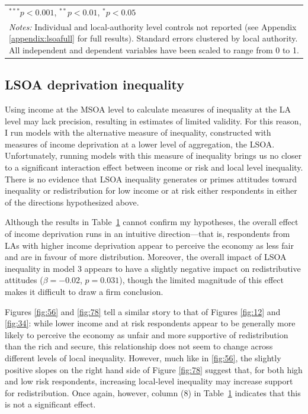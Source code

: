 \documentclass[12pt, letter]{scrartcl}
\begin{document}
\begin{table}[t]
{\begin{tabular}{l c c c c c c c c}
\toprule[1.5pt]
\multicolumn{9}{l}{\normalsize{$^{***}p<0.001$, $^{**}p<0.01$, $^*p<0.05$}} \\[-4pt]
\multicolumn{9}{l}{\multirow{3}{590pt}{\normalsize{\textit{Notes:} Individual and local-authority level controls not reported (see Appendix \ref{appendix:lsoafull} for full results). Standard errors clustered by local authority. All independent and dependent variables have been scaled to range from 0 to 1.}}} \\
\\
\end{tabular}}
\label{table:lsoatable}
\end{table}


\subsection{LSOA deprivation inequality}

Using income at the MSOA level to calculate measures of inequality at the LA level may lack precision, resulting in estimates of limited validity. For this reason, I run models with the alternative measure of inequality, constructed with measures of income deprivation at a lower level of aggregation, the LSOA. Unfortunately, running models with this measure of inequality brings us no closer to a significant interaction effect between income or risk and local level inequality. There is no evidence that LSOA inequality generates or primes attitudes toward inequality or redistribution for low income or at risk either respondents in either of the directions hypothesized above. 

Although the results in Table~\ref{table:lsoatable} cannot confirm my hypotheses, the overall effect of income deprivation runs in an intuitive direction---that is, respondents from LAs with higher income deprivation appear to perceive the economy as less fair and are in favour of more distribution. Moreover, the overall impact of LSOA inequality in model 3 appears to have a slightly negative impact on redistributive attitudes ($\beta = -0.02$, $p = 0.031$), though the limited magnitude of this effect makes it difficult to draw a firm conclusion. 

Figures \ref{fig:56} and \ref{fig:78} tell a similar story to that of Figures \ref{fig:12} and \ref{fig:34}: while lower income and at risk respondents appear to be generally more likely to perceive the economy as unfair and more supportive of redistribution than the rich and secure, this relationship does not seem to change across different levels of local inequality. However, much like in \ref{fig:56}, the slightly positive slopes on the right hand side of Figure \ref{fig:78} suggest that, for both high and low risk respondents, increasing local-level inequality may increase support for redistribution. Once again, however, column (8) in Table~\ref{table:lsoatable} indicates that this is not a significant effect. 
\end{document}
